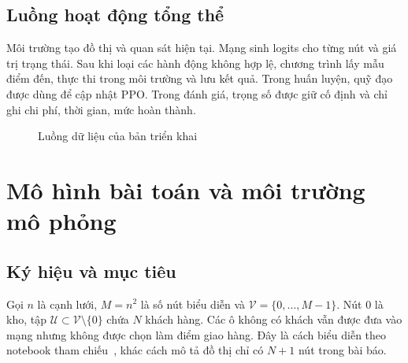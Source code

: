 \documentclass[12pt,a4paper,oneside]{report}
\begin{document}
\section{Luồng hoạt động tổng thể}
Môi trường tạo đồ thị và quan sát hiện tại. Mạng sinh logits cho từng nút
và giá trị trạng thái. Sau khi loại các hành động không hợp lệ, chương
trình lấy mẫu điểm đến, thực thi trong môi trường và lưu kết quả. Trong
huấn luyện, quỹ đạo được dùng để cập nhật PPO. Trong đánh giá, trọng số
được giữ cố định và chỉ ghi chi phí, thời gian, mức hoàn thành.

\begin{figure}[htbp]
\centering
{}
\caption{Luồng dữ liệu của bản triển khai}
\end{figure}

\chapter{Mô hình bài toán và môi trường mô phỏng}
\section{Ký hiệu và mục tiêu}
Gọi $n$ là cạnh lưới, $M=n^2$ là số nút biểu diễn và
$\mathcal V=\{0,\ldots,M-1\}$. Nút $0$ là kho, tập
$\mathcal U\subset\mathcal V\setminus\{0\}$ chứa $N$ khách hàng.
Các ô không có khách vẫn được đưa vào mạng nhưng không được chọn làm
điểm giao hàng. Đây là cách biểu diễn theo notebook tham chiếu~\cite{notebook},
khác cách mô tả đồ thị chỉ có $N+1$ nút trong bài báo.
\end{document}
